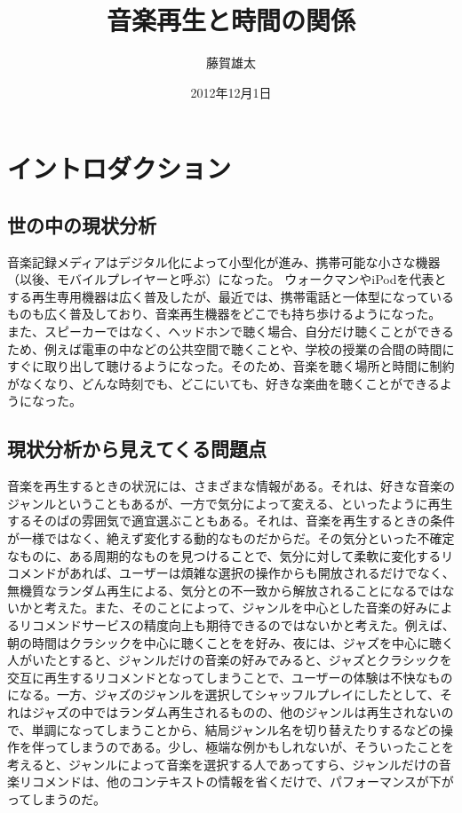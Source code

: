 \documentclass{jsarticle}
\begin{document}
\title{音楽再生と時間の関係}
\author{藤賀雄太}
\date{2012年12月1日}
\maketitle

\section{イントロダクション}
\subsection{世の中の現状分析}
音楽記録メディアはデジタル化によって小型化が進み、携帯可能な小さな機器（以後、モバイルプレイヤーと呼ぶ）になった。
ウォークマンやiPodを代表とする再生専用機器は広く普及したが、最近では、携帯電話と一体型になっているものも広く普及しており、音楽再生機器をどこでも持ち歩けるようになった。
また、スピーカーではなく、ヘッドホンで聴く場合、自分だけ聴くことができるため、例えば電車の中などの公共空間で聴くことや、学校の授業の合間の時間にすぐに取り出して聴けるようになった。そのため、音楽を聴く場所と時間に制約がなくなり、どんな時刻でも、どこにいても、好きな楽曲を聴くことができるようになった。

\subsection{現状分析から見えてくる問題点}
音楽を再生するときの状況には、さまざまな情報がある。それは、好きな音楽のジャンルということもあるが、一方で気分によって変える、といったように再生するそのばの雰囲気で適宜選ぶこともある。それは、音楽を再生するときの条件が一様ではなく、絶えず変化する動的なものだからだ。その気分といった不確定なものに、ある周期的なものを見つけることで、気分に対して柔軟に変化するリコメンドがあれば、ユーザーは煩雑な選択の操作からも開放されるだけでなく、無機質なランダム再生による、気分との不一致から解放されることになるではないかと考えた。また、そのことによって、ジャンルを中心とした音楽の好みによるリコメンドサービスの精度向上も期待できるのではないかと考えた。例えば、朝の時間はクラシックを中心に聴くことをを好み、夜には、ジャズを中心に聴く人がいたとすると、ジャンルだけの音楽の好みでみると、ジャズとクラシックを交互に再生するリコメンドとなってしまうことで、ユーザーの体験は不快なものになる。一方、ジャズのジャンルを選択してシャッフルプレイにしたとして、それはジャズの中ではランダム再生されるものの、他のジャンルは再生されないので、単調になってしまうことから、結局ジャンル名を切り替えたりするなどの操作を伴ってしまうのである。少し、極端な例かもしれないが、そういったことを考えると、ジャンルによって音楽を選択する人であってすら、ジャンルだけの音楽リコメンドは、他のコンテキストの情報を省くだけで、パフォーマンスが下がってしまうのだ。
\end{document}
